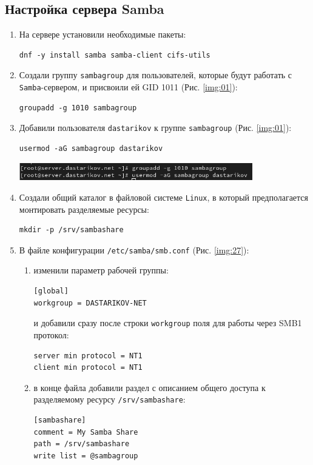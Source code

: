 \subsection{Настройка сервера Samba}
\begin{enumerate}
\item На сервере установили необходимые пакеты:
    \begin{verbatim}
dnf -y install samba samba-client cifs-utils
    \end{verbatim}
\item Создали группу {\tt sambagroup} для пользователей, которые будут работать с {\tt Samba}-сервером, и присвоили ей GID 1011 (Рис. \ref{img:01}):
    \begin{verbatim}
groupadd -g 1010 sambagroup
    \end{verbatim}
\item Добавили пользователя {\tt dastarikov} к группе {\tt sambagroup} (Рис. \ref{img:01}):
    \begin{verbatim}
usermod -aG sambagroup dastarikov
    \end{verbatim}

\begin{center}
    \centering
    \includegraphics[width=0.8\textwidth]{../images/image01.png}
    \label{img:01}
\end{center}

\item Создали общий каталог в файловой системе {\tt Linux}, в который предполагается монтировать разделяемые ресурсы:
    \begin{verbatim}
mkdir -p /srv/sambashare
    \end{verbatim}
\item В файле конфигурации {\tt /etc/samba/smb.conf} (Рис. \ref{img:27}):
    \begin{enumerate}
        \item изменили параметр рабочей группы:
    \begin{verbatim}
[global]
workgroup = DASTARIKOV-NET
    \end{verbatim}
    и добавили сразу после строки {\tt workgroup} поля для работы через SMB1 протокол:
    \begin{verbatim}
server min protocol = NT1
client min protocol = NT1
    \end{verbatim}
\item в конце файла добавили раздел с описанием общего доступа к разделяемому ресурсу {\tt /srv/sambashare}:
    \begin{verbatim}
[sambashare]
comment = My Samba Share
path = /srv/sambashare
write list = @sambagroup
    \end{verbatim}


\end{enumerate}
\end{enumerate}
